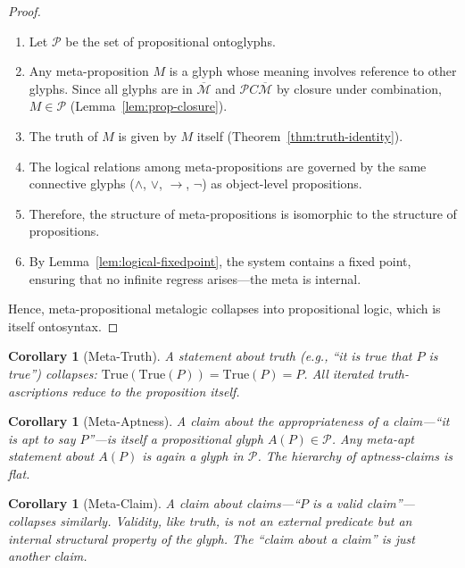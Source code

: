 \documentclass[12pt, letterpaper]{book}
\def\equiv{=}%
\def\subset{C}%
\newtheorem{corollary}[theorem]{Corollary}
\begin{document}
\begin{proof}
\begin{enumerate}[label=(\roman*)]
    \item Let $\mathcal{P}$ be the set of propositional ontoglyphs.
    \item Any meta-proposition $M$ is a glyph whose meaning involves reference to other glyphs. Since all glyphs are in $\overline{\mathcal{M}}$ and $\mathcal{P} \subset \overline{\mathcal{M}}$ by closure under combination, $M \in \mathcal{P}$ (Lemma~\ref{lem:prop-closure}).
    \item The truth of $M$ is given by $M$ itself (Theorem~\ref{thm:truth-identity}).
    \item The logical relations among meta-propositions are governed by the same connective glyphs ($\land$, $\lor$, $\to$, $\neg$) as object-level propositions.
    \item Therefore, the structure of meta-propositions is isomorphic to the structure of propositions.
    \item By Lemma~\ref{lem:logical-fixedpoint}, the system contains a fixed point, ensuring that no infinite regress arises---the meta is internal.
\end{enumerate}
Hence, meta-propositional metalogic collapses into propositional logic, which is itself ontosyntax.
\end{proof}

\begin{corollary}[Meta-Truth]
A statement about truth (e.g., ``it is true that $P$ is true'') collapses: $\mathrm{True}(\mathrm{True}(P)) \equiv \mathrm{True}(P) \equiv P$. All iterated truth-ascriptions reduce to the proposition itself.
\end{corollary}

\begin{corollary}[Meta-Aptness]
A claim about the appropriateness of a claim---``it is apt to say $P$''---is itself a propositional glyph $A(P) \in \mathcal{P}$. Any meta-apt statement about $A(P)$ is again a glyph in $\mathcal{P}$. The hierarchy of aptness-claims is flat.
\end{corollary}

\begin{corollary}[Meta-Claim]
A claim about claims---``$P$ is a valid claim''---collapses similarly. Validity, like truth, is not an external predicate but an internal structural property of the glyph. The ``claim about a claim'' is just another claim.
\end{corollary}
\end{document}
